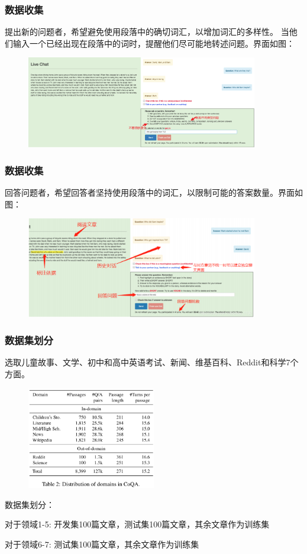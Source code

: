\documentclass{beamer}
\begin{document}
\begin{frame}
    \frametitle{数据收集}
    提出新的问题者，希望避免使用段落中的确切词汇，以增加词汇的多样性。
    当他们输入一个已经出现在段落中的词时，提醒他们尽可能地转述问题。界面如图：
    \begin{figure}[tb]
        \centering
        \includegraphics[width=0.9\textwidth]{fig/interface1.png}
    \end{figure}
\end{frame}

\begin{frame}
    \frametitle{数据收集}
    回答问题者，希望回答者坚持使用段落中的词汇，以限制可能的答案数量。界面如图：
    \begin{figure}[tb]
        \centering
        \includegraphics[width=0.9\textwidth]{fig/interface2.png}
    \end{figure}
\end{frame}

\begin{frame}
    \frametitle{数据集划分}
    选取儿童故事、文学、初中和高中英语考试、新闻、维基百科、Reddit和科学7个方面。
    \begin{figure}[tb]
        \centering
        \includegraphics[width=0.5\textwidth]{fig/datafrom.png}
    \end{figure}
    数据集划分：

    对于领域1-5: 开发集100篇文章，测试集100篇文章，其余文章作为训练集

    对于领域6-7: 测试集100篇文章，其余文章作为训练集
\end{frame}
\end{document}
